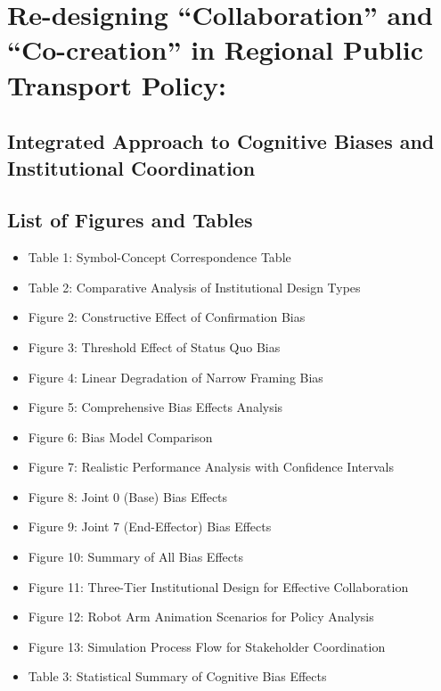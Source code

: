 \section{Re-designing ``Collaboration'' and ``Co-creation'' in Regional
Public Transport
Policy:}\label{re-designing-collaboration-and-co-creation-in-regional-public-transport-policy}

\subsection{Integrated Approach to Cognitive Biases and Institutional
Coordination}\label{integrated-approach-to-cognitive-biases-and-institutional-coordination}

\subsection{List of Figures and
Tables}\label{list-of-figures-and-tables}

\begin{itemize}
\tightlist
\item
  Table 1: Symbol-Concept Correspondence Table
\item
  Table 2: Comparative Analysis of Institutional Design Types
\item
  Figure 2: Constructive Effect of Confirmation Bias
\item
  Figure 3: Threshold Effect of Status Quo Bias
\item
  Figure 4: Linear Degradation of Narrow Framing Bias
\item
  Figure 5: Comprehensive Bias Effects Analysis
\item
  Figure 6: Bias Model Comparison
\item
  Figure 7: Realistic Performance Analysis with Confidence Intervals
\item
  Figure 8: Joint 0 (Base) Bias Effects
\item
  Figure 9: Joint 7 (End-Effector) Bias Effects
\item
  Figure 10: Summary of All Bias Effects
\item
  Figure 11: Three-Tier Institutional Design for Effective Collaboration
\item
  Figure 12: Robot Arm Animation Scenarios for Policy Analysis
\item
  Figure 13: Simulation Process Flow for Stakeholder Coordination
\item
  Table 3: Statistical Summary of Cognitive Bias Effects
\end{itemize}

